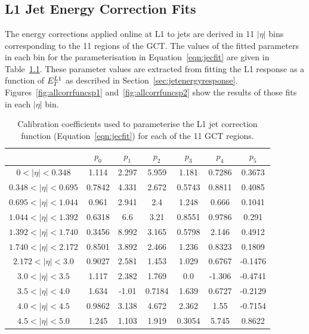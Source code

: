 \chapter{}
\section{L1 Jet Energy Correction Fits}
\label{app:jecfits}
The energy corrections applied online at L1 to jets are derived in 11 $|\eta|$ bins
corresponding to the 11 regions of the GCT. The values of the fitted parameters
in each bin for the parameterisation in Equation~\ref{eqn:jecfit} are 
given in Table~\ref{tab:calibrationcoeffs}. These parameter values are extracted from 
fitting the L1 response as a function of $E_{T}^{L1}$ as described in 
Section~\ref{sec:jetenergyresponse}. Figures~\ref{fig:allcorrfuncsp1} 
and~\ref{fig:allcorrfuncsp2} show the results of those fits in each $|\eta|$ bin.

\begin{table}
\centering
\begin{tabular}{| c | c | c | c | c | c | c |}
\hline
 & $p_{0}$ & $p_{1}$ & $p_{2}$ & $p_{3}$ & $p_{4}$ & $p_{5}$ \\
\hline
$0<|\eta|<0.348$            &1.114      &2.297  &5.959  &1.181  &0.7286 &0.3673         \\
$0.348<|\eta|<0.695$    &0.7842 &4.331  &2.672  &0.5743 &0.8811 &0.4085         \\
$0.695<|\eta|<1.044$    &0.961  &2.941  &2.4      &1.248        &0.666  &0.1041         \\
$1.044<|\eta|<1.392$    &0.6318 &6.6      &3.21         &0.8551 &0.9786 &0.291          \\
$1.392<|\eta|<1.740$    &0.3456 &8.992  &3.165  &0.5798 &2.146  &0.4912         \\
$1.740<|\eta|<2.172$    &0.8501 &3.892  &2.466  &1.236  &0.8323 &0.1809         \\
$2.172<|\eta|<3.0$        &0.9027       &2.581  &1.453  &1.029  &0.6767 &-0.1476        \\
$3.0<|\eta|<3.5$      &1.117    &2.382  &1.769  &0.0      &-1.306 &-0.4741      \\
$3.5<|\eta|<4.0$      &1.634    &-1.01  &0.7184 &1.639  &0.6727 &-0.2129        \\
$4.0<|\eta|<4.5$      &0.9862 &3.138    &4.672  &2.362  &1.55   &-0.7154        \\
$4.5<|\eta|<5.0$      &1.245    &1.103  &1.919  &0.3054 &5.745  &0.8622 \\ 
\hline
\end{tabular}   
\caption{Calibration coefficients used to parameterise the L1 jet correction function
 (Equation~\ref{eqn:jecfit}) for each of the 11 GCT regions.}
\label{tab:calibrationcoeffs}
\end{table}

